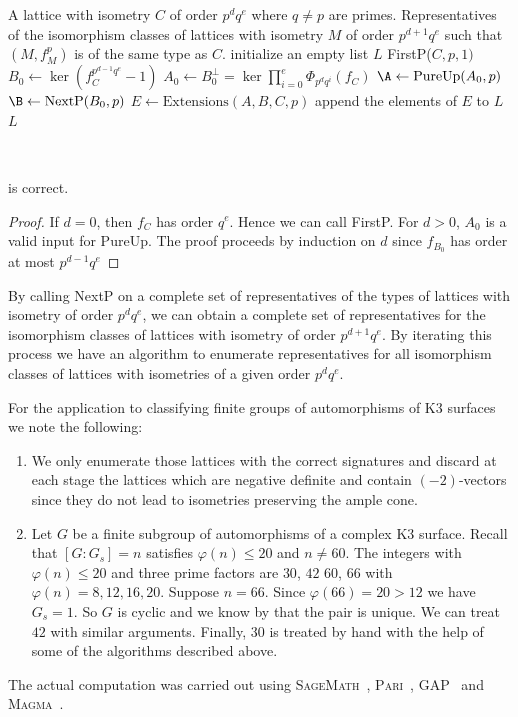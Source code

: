 \begingroup
{}\label{NextP}
\endgroup
\begin{algorithmic}[1]
\REQUIRE A lattice with isometry $C$ of order $p^dq^e$ where $q \neq p$ are primes.
\ENSURE Representatives of the isomorphism classes of lattices with isometry $M$ of order $p^{d+1}q^e$ such that $(M,f_M^p)$ is of the same type as $C$.
\STATE initialize an empty list $L$
    \RETURN FirstP($C,p,1)$
\ENDIF
\STATE $B_0 \gets \ker( f_C^{p^{d-1}q^e}-1)$
\STATE $A_0 \gets B_0^\perp = \ker \prod_{i=0}^e \Phi_{p^dq^i}(f_C)$
\STATE $\A \gets \mbox{PureUp}(A_0, p)$
\STATE $\B \gets \mbox{NextP}(B_0, p)$
    \STATE $E \gets \mbox{Extensions}(A,B,C,p)$
    \STATE append the elements of $E$ to $L$
\ENDFOR
\RETURN $L$
\end{algorithmic}\hrulefill\\
\begin{lemma}
 is correct.
\end{lemma}
\begin{proof}
 If $d=0$, then $f_C$ has order $q^e$. Hence we can call FirstP. For $d>0$, $A_0$ is a valid input for PureUp.
The proof proceeds by induction on $d$ since $f_{B_0}$ has order at most $p^{d-1}q^e$
\end{proof}

By calling NextP on a complete set of representatives of the types of lattices with isometry of order $p^dq^e$, we can obtain a complete set of representatives for the isomorphism classes of lattices with isometry of order $p^{d+1}q^e$.
By iterating this process we have an algorithm to enumerate representatives for all isomorphism classes of lattices with isometries of a given order $p^d q^e$.

\begin{remark}\label{rem:latticeK3}
  For the application to classifying finite groups of automorphisms of K3 surfaces we note the following:
  \begin{enumerate}
    \item
     We only enumerate those lattices with the correct signatures and discard at each stage the lattices which are negative definite and contain $(-2)$-vectors since they do not lead to isometries preserving the ample cone.
    \item
Let $G$ be a finite subgroup of automorphisms of a complex K3 surface.
Recall that $[G:G_s]=n$ satisfies $\varphi(n) \leq 20$ and $n \neq 60$.
The integers with $\varphi(n) \leq 20$ and three prime factors are
$30$, $42$ $60$, $66$ with $\varphi(n) = 8 , 12 , 16, 20$.
      Suppose $n = 66$. Since $\varphi(66)=20>12$ we have $G_s=1$. So $G$ is cyclic and we know by \cite{keum2015} that the pair is unique. We can treat $42$ with similar arguments. Finally, $30$ is treated by hand with the help of some of the algorithms described above.
  \end{enumerate}

  The actual computation was carried out using \textsc{SageMath}~\cite{sagemath}, \textsc{Pari}~\cite{PARI}, \textsc{GAP}~\cite{GAP4} and \textsc{Magma}~\cite{magma}.
\end{remark}

